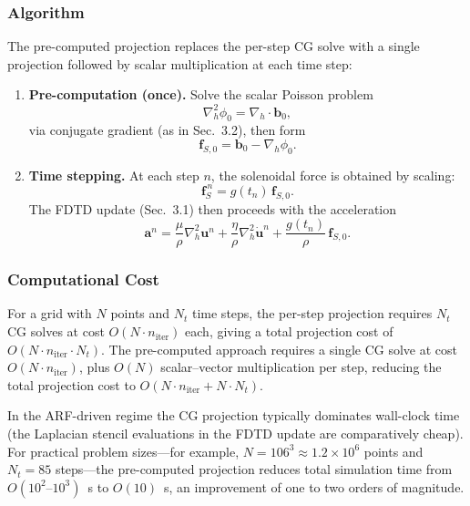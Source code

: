 \documentclass[11pt]{article}
\begin{document}
\subsubsection{Algorithm}

The pre-computed projection replaces the per-step CG solve with a single
projection followed by scalar multiplication at each time step:

\begin{enumerate}[leftmargin=1.5em]
\item \textbf{Pre-computation (once).} Solve the scalar Poisson problem
\begin{equation}
\nabla_h^2 \phi_0 = \nabla_h \cdot \bm{b}_0,
\end{equation}
via conjugate gradient (as in Sec.~3.2), then form
\begin{equation}
\bm{f}_{S,0} = \bm{b}_0 - \nabla_h \phi_0.
\end{equation}

\item \textbf{Time stepping.} At each step $n$, the solenoidal force is
obtained by scaling:
\begin{equation}
\bm{f}_S^{\,n} = g(t_n)\,\bm{f}_{S,0}.
\end{equation}
The FDTD update (Sec.~3.1) then proceeds with the acceleration
\begin{equation}
\bm{a}^{n}
=
\frac{\mu}{\rho}\nabla_h^2 \bm{u}^{n}
+
\frac{\eta}{\rho}\nabla_h^2 \dot{\bm{u}}^{n}
+
\frac{g(t_n)}{\rho}\,\bm{f}_{S,0}.
\end{equation}
\end{enumerate}

\subsubsection{Computational Cost}

For a grid with $N$ points and $N_t$ time steps, the per-step projection
requires $N_t$ CG solves at cost $O(N \cdot n_{\mathrm{iter}})$ each, giving a
total projection cost of $O(N \cdot n_{\mathrm{iter}} \cdot N_t)$. The
pre-computed approach requires a single CG solve at cost
$O(N \cdot n_{\mathrm{iter}})$, plus $O(N)$ scalar--vector multiplication per
step, reducing the total projection cost to
$O(N \cdot n_{\mathrm{iter}} + N \cdot N_t)$.

In the ARF-driven regime the CG projection typically dominates wall-clock time
(the Laplacian stencil evaluations in the FDTD update are comparatively cheap).
For practical problem sizes---for example, $N = 106^3 \approx 1.2 \times 10^6$
points and $N_t = 85$ steps---the pre-computed projection reduces total
simulation time from $O(10^2\text{--}10^3)$~s to $O(10)$~s, an improvement of
one to two orders of magnitude.
\end{document}
